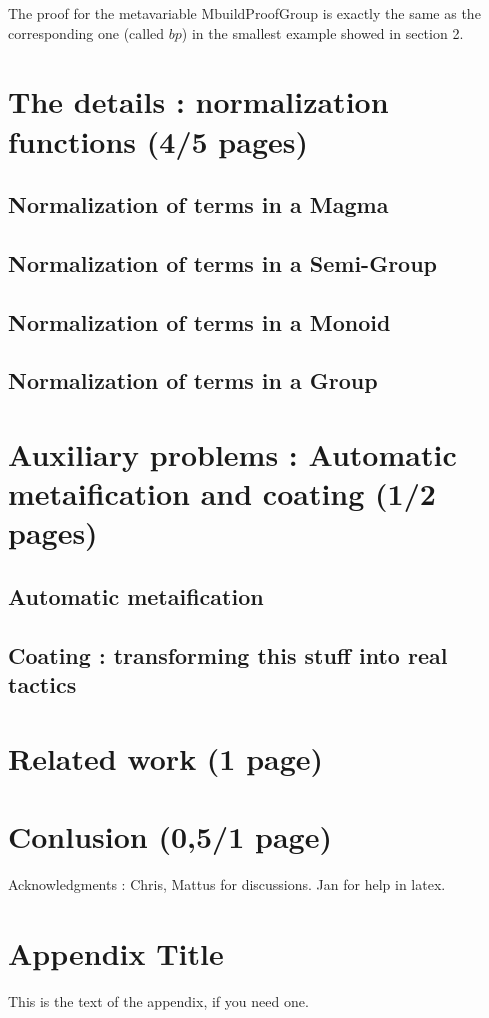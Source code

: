 \documentclass{sigplanconf}
\begin{document}
The proof for the metavariable MbuildProofGroup is exactly the same as the corresponding one (called $bp$) in the smallest example showed in section 2.


\section {The details : normalization functions (4/5 pages)}

	\subsection {Normalization of terms in a Magma}

	\subsection {Normalization of terms in a Semi-Group}

	\subsection {Normalization of terms in a Monoid}

	\subsection {Normalization of terms in a Group}

\section {Auxiliary problems : Automatic metaification and coating (1/2 pages)}

	\subsection {Automatic metaification}

	\subsection {Coating : transforming this stuff into real tactics}

\section {Related work (1 page)}

\section {Conlusion (0,5/1 page)}


\acks

Acknowledgments : Chris, Mattus for discussions. Jan for help in latex.





\appendix
\section{Appendix Title}

This is the text of the appendix, if you need one.
\end{document}
